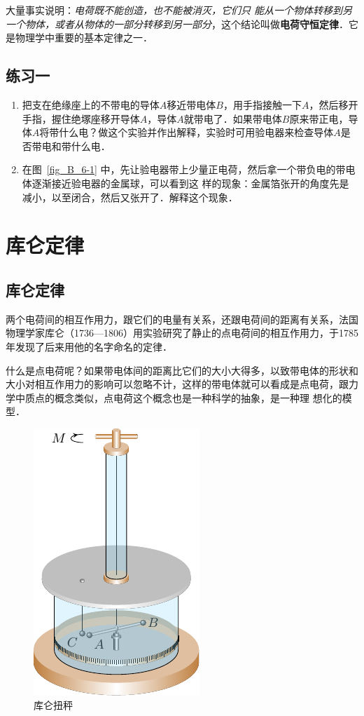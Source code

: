 大量事实说明：\textit{电荷既不能创造，也不能被消灭，它们只
能从一个物体转移到另一个物体，或者从物体的一部分转移到另一部分}，这个结论叫做\textbf{电荷守恒定律}．它是物理学中重要的基本定律之一．

\subsection*{练习一}
\begin{enumerate}
\item 把支在绝缘座上的不带电的导体$A$移近带电体$B$，用手指接触一下$A$，然后移开手指，握住绝塚座移开导体$A$，导体$A$就带电了．如果带电体$B$原来带正电，导体$A$将带什么电？做这个实验并作出解释，实验时可用验电器来检查导体$A$是否带电和带什么电．
\item 在图~\ref{fig_B_6-1} 中，先让验电器带上少量正电荷，然后拿一个带负电的带电体逐渐接近验电器的金属球，可以看到这
样的现象：金属箔张开的角度先是减小，以至闭合，然后又张开了．解释这个现象．
\end{enumerate}


\section{库仑定律}
\subsection{库仑定律} 

两个电荷间的相互作用力，跟它们的电量有关系，还跟电荷间的距离有关系，法国物理学家库仑（1736—1806）用实验研究了静止的点电荷间的相互作用力，于1785年发现了后来用他的名字命名的定律．

什么是点电荷呢？如果带电体间的距离比它们的大小大得多，以致带电体的形状和大小对相互作用力的影响可以忽略不计，这样的带电体就可以看成是点电荷，跟力学中质点的概念类似，点电荷这个概念也是一种科学的抽象，是一种理
想化的模型．

\begin{figure}[htbp]
    \centering
    \includegraphics{fig/B/6-3.pdf}
    \caption{库仑扭秤}\label{fig_B_6-3}
\end{figure}

